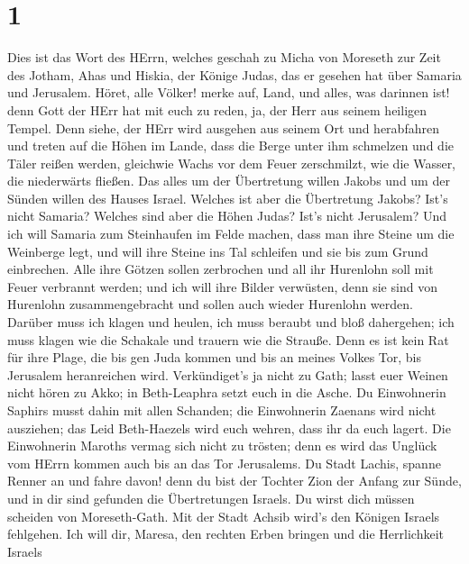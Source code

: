 \hypertarget{section}{%
\section{1}\label{section}}

 Dies ist das Wort des HErrn, welches geschah zu Micha von
Moreseth zur Zeit des Jotham, Ahas und Hiskia, der Könige Judas, das er
gesehen hat über Samaria und Jerusalem.  Höret, alle Völker!
merke auf, Land, und alles, was darinnen ist! denn Gott der HErr hat mit
euch zu reden, ja, der Herr aus seinem heiligen Tempel. 
Denn siehe, der HErr wird ausgehen aus seinem Ort und herabfahren und
treten auf die Höhen im Lande,  dass die Berge unter ihm
schmelzen und die Täler reißen werden, gleichwie Wachs vor dem Feuer
zerschmilzt, wie die Wasser, die niederwärts fließen.  Das
alles um der Übertretung willen Jakobs und um der Sünden willen des
Hauses Israel. Welches ist aber die Übertretung Jakobs? Ist's nicht
Samaria? Welches sind aber die Höhen Judas? Ist's nicht Jerusalem?
 Und ich will Samaria zum Steinhaufen im Felde machen, dass
man ihre Steine um die Weinberge legt, und will ihre Steine ins Tal
schleifen und sie bis zum Grund einbrechen.  Alle ihre
Götzen sollen zerbrochen und all ihr Hurenlohn soll mit Feuer verbrannt
werden; und ich will ihre Bilder verwüsten, denn sie sind von Hurenlohn
zusammengebracht und sollen auch wieder Hurenlohn werden. 
Darüber muss ich klagen und heulen, ich muss beraubt und bloß
dahergehen; ich muss klagen wie die Schakale und trauern wie die
Strauße.  Denn es ist kein Rat für ihre Plage, die bis gen
Juda kommen und bis an meines Volkes Tor, bis Jerusalem heranreichen
wird.  Verkündiget's ja nicht zu Gath; lasst euer Weinen
nicht hören zu Akko; in Beth-Leaphra setzt euch in die Asche.
 Du Einwohnerin Saphirs musst dahin mit allen Schanden; die
Einwohnerin Zaenans wird nicht ausziehen; das Leid Beth-Haezels wird
euch wehren, dass ihr da euch lagert.  Die Einwohnerin
Maroths vermag sich nicht zu trösten; denn es wird das Unglück vom HErrn
kommen auch bis an das Tor Jerusalems.  Du Stadt Lachis,
spanne Renner an und fahre davon! denn du bist der Tochter Zion der
Anfang zur Sünde, und in dir sind gefunden die Übertretungen Israels.
 Du wirst dich müssen scheiden von Moreseth-Gath. Mit der
Stadt Achsib wird's den Königen Israels fehlgehen.  Ich
will dir, Maresa, den rechten Erben bringen und die Herrlichkeit Israels
